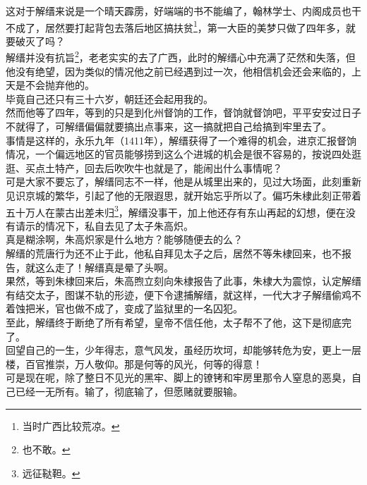 \begin{multicols}{\theparacolNo}
这对于解缙来说是一个晴天霹雳，好端端的书不能编了，翰林学士、内阁成员也干不成了，居然要打起背包去落后地区搞扶贫\footnote{当时广西比较荒凉。}，第一大臣的美梦只做了四年多，就要破灭了吗？\\

解缙并没有抗旨\footnote{也不敢。}，老老实实的去了广西，此时的解缙心中充满了茫然和失落，但他没有绝望，因为类似的情况他之前已经遇到过一次，他相信机会还会来临的，上天是不会抛弃他的。\\

毕竟自己还只有三十六岁，朝廷还会起用我的。\\

然而他等了四年，等到的只是到化州督饷的工作，督饷就督饷吧，平平安安过日子不就得了，可解缙偏偏就要搞出点事来，这一搞就把自己给搞到牢里去了。\\

事情是这样的，永乐九年（1411年），解缙获得了一个难得的机会，进京汇报督饷情况，一个偏远地区的官员能够捞到这么个进城的机会是很不容易的，按说四处逛逛、买点土特产，回去后吹吹牛也就是了，能闹出什么事情呢？\\

可是大家不要忘了，解缙同志不一样，他是从城里出来的，见过大场面，此刻重新见识京城的繁华，引起了他的无限遐思，就开始忘乎所以了。偏巧朱棣此刻正带着五十万人在蒙古出差未归\footnote{远征鞑靼。}，解缙没事干，加上他还存有东山再起的幻想，便在没有请示的情况下，私自去见了太子朱高炽。\\

真是糊涂啊，朱高炽家是什么地方？能够随便去的么？\\

解缙的荒唐行为还不止于此，他私自拜见太子之后，居然不等朱棣回来，也不报告，就这么走了！解缙真是晕了头啊。\\

果然，等到朱棣回来后，朱高煦立刻向朱棣报告了此事，朱棣大为震惊，认定解缙有结交太子，图谋不轨的形迹，便下令逮捕解缙，就这样，一代大才子解缙偷鸡不着蚀把米，官也做不成了，变成了监狱里的一名囚犯。\\

至此，解缙终于断绝了所有希望，皇帝不信任他，太子帮不了他，这下是彻底完了。\\

回望自己的一生，少年得志，意气风发，虽经历坎坷，却能够转危为安，更上一层楼，百官推崇，万人敬仰。那是何等的风光，何等的得意！\\

可是现在呢，除了整日不见光的黑牢、脚上的镣铐和牢房里那令人窒息的恶臭，自己已经一无所有。输了，彻底输了，但愿赌就要服输。\\


\end{multicols}
